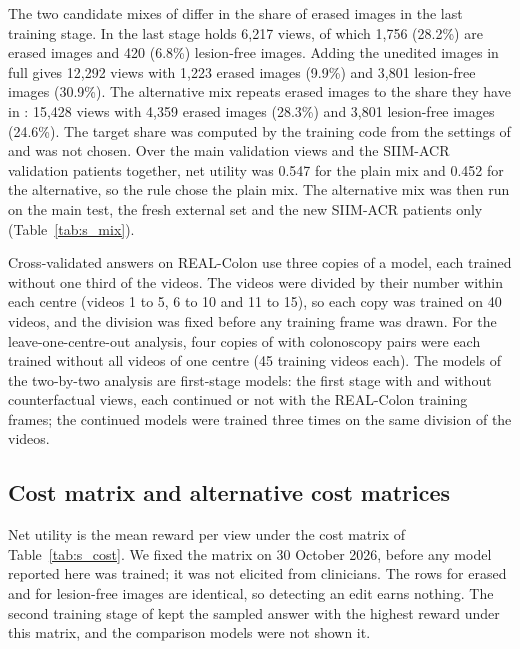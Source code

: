 The two candidate mixes of \msn{} differ in the share of erased images in the last training stage. In \msp{} the last stage holds 6,217 views, of which 1,756 (28.2\%) are erased images and 420 (6.8\%) lesion-free images. Adding the unedited images in full gives 12,292 views with 1,223 erased images (9.9\%) and 3,801 lesion-free images (30.9\%). The alternative mix repeats erased images to the share they have in \msp: 15,428 views with 4,359 erased images (28.3\%) and 3,801 lesion-free images (24.6\%). The target share was computed by the training code from the settings of \msp{} and was not chosen. Over the main validation views and the SIIM-ACR validation patients together, net utility was 0.547 for the plain mix and 0.452 for the alternative, so the rule chose the plain mix. The alternative mix was then run on the main test, the fresh external set and the new SIIM-ACR patients only (Table~\ref{tab:s_mix}).

Cross-validated answers on REAL-Colon use three copies of a model, each trained without one third of the videos. The videos were divided by their number within each centre (videos 1 to 5, 6 to 10 and 11 to 15), so each copy was trained on 40 videos, and the division was fixed before any training frame was drawn. For the leave-one-centre-out analysis, four copies of \msp{} with colonoscopy pairs were each trained without all videos of one centre (45 training videos each). The models of the two-by-two analysis are first-stage models: the first stage with and without counterfactual views, each continued or not with the REAL-Colon training frames; the continued models were trained three times on the same division of the videos.

\subsection{Cost matrix and alternative cost matrices}

Net utility is the mean reward per view under the cost matrix of Table~\ref{tab:s_cost}. We fixed the matrix on 30 October 2026, before any model reported here was trained; it was not elicited from clinicians. The rows for erased and for lesion-free images are identical, so detecting an edit earns nothing. The second training stage of \ms{} kept the sampled answer with the highest reward under this matrix, and the comparison models were not shown it.

